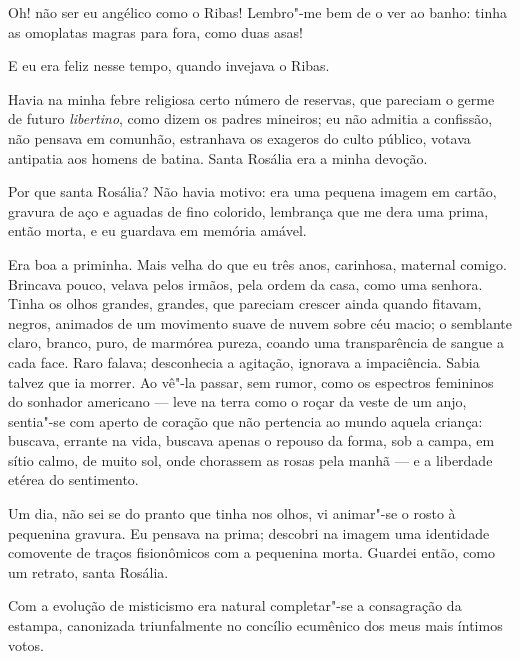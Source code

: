 Oh! não ser eu angélico como o Ribas! Lembro"-me
bem de o ver ao banho: tinha as omoplatas magras para fora, 
como duas asas! 

E eu era feliz nesse tempo, quando invejava o Ribas. 

Havia na minha febre religiosa certo número de reservas, que pareciam o germe de
futuro \textit{libertino}, como dizem os padres mineiros; eu não admitia a
confissão, não pensava em comunhão, estranhava os exageros do culto
público, votava antipatia aos homens de batina. Santa Rosália era a
minha devoção. 

Por que santa Rosália? Não havia motivo: era uma pequena
imagem em cartão, gravura de aço e aguadas de fino colorido, lembrança
que me dera uma prima, então morta, e eu guardava em memória amável.

Era boa a priminha. Mais velha do que eu três anos, carinhosa, maternal
comigo. Brincava pouco, velava pelos irmãos, pela ordem da casa, como
uma senhora. Tinha os olhos grandes, grandes, que pareciam crescer
ainda quando fitavam, negros, animados de um movimento suave de nuvem
sobre céu macio; o semblante claro, branco, puro, de marmórea pureza,
coando uma transparência de sangue a cada face. Raro falava;
desconhecia a agitação, ignorava a impaciência. Sabia talvez que ia
morrer. Ao vê"-la passar, sem rumor, como os espectros femininos do
sonhador americano --- leve na terra como o roçar da veste de um anjo,
sentia"-se com aperto de coração que não pertencia ao mundo aquela
criança: buscava, errante na vida, buscava apenas o repouso da forma,
sob a campa, em sítio calmo, de muito sol, onde chorassem as rosas pela
manhã --- e a liberdade etérea do sentimento. 

Um dia, não sei se do
pranto que tinha nos olhos, vi animar"-se o rosto à pequenina gravura.
Eu pensava na prima; descobri na imagem uma identidade comovente de
traços fisionômicos com a pequenina morta. Guardei então, como um
retrato, santa Rosália. 

Com a evolução de misticismo era natural
completar"-se a consagração da estampa, canonizada triunfalmente no
concílio ecumênico dos meus mais íntimos votos.

